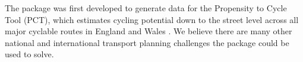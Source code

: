 The  package was first developed to generate data for the Propensity to Cycle Tool (PCT), which estimates cycling potential down to the street level across all major cyclable routes in England and Wales \citep{lovelace_propensity_2017}.
We believe there are many other national and international transport planning challenges the package could be used to solve.
%
%
